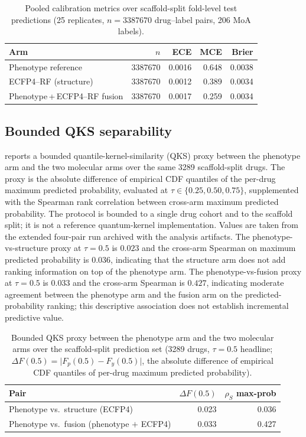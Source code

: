 \documentclass[11pt,a4paper]{article}
\begin{document}
\begin{table}[htbp]
\centering
\caption{Pooled calibration metrics over scaffold-split fold-level test predictions (\num{25} replicates, $n=\num{3387670}$ drug--label pairs, \num{206} MoA labels).}
\label{tab:p6_calibration}
\begin{tabular}{lrrrr}
\toprule
Arm & $n$ & ECE & MCE & Brier \\
\midrule
Phenotype reference & \num{3387670} & \num{0.0016} & \num{0.648} & \num{0.0038} \\
ECFP4--RF (structure) & \num{3387670} & \num{0.0012} & \num{0.389} & \num{0.0034} \\
Phenotype\,+\,ECFP4--RF fusion & \num{3387670} & \num{0.0017} & \num{0.259} & \num{0.0034} \\
\bottomrule
\end{tabular}
\end{table}

\subsection{Bounded QKS separability}

 reports a bounded quantile-kernel-similarity (QKS) proxy between the phenotype arm and the two molecular arms over the same \num{3289} scaffold-split drugs. The proxy is the absolute difference of empirical CDF quantiles of the per-drug maximum predicted probability, evaluated at $\tau\in\{0.25,0.50,0.75\}$, supplemented with the Spearman rank correlation between cross-arm maximum predicted probability. The protocol is bounded to a single drug cohort and to the scaffold split; it is not a reference quantum-kernel implementation. Values are taken from the extended four-pair run archived with the analysis artifacts. The phenotype-vs-structure proxy at $\tau=0.5$ is $\num{0.023}$ and the cross-arm Spearman on maximum predicted probability is $\num{0.036}$, indicating that the structure arm does not add ranking information on top of the phenotype arm. The phenotype-vs-fusion proxy at $\tau=0.5$ is $\num{0.033}$ and the cross-arm Spearman is $\num{0.427}$, indicating moderate agreement between the phenotype arm and the fusion arm on the predicted-probability ranking; this descriptive association does not establish incremental predictive value.

\begin{table}[htbp]
\centering
\caption{Bounded QKS proxy between the phenotype arm and the two molecular arms over the scaffold-split prediction set (\num{3289} drugs, $\tau=0.5$ headline; $\Delta F(0.5)=\lvert F_p(0.5)-F_y(0.5)\rvert$, the absolute difference of empirical CDF quantiles of per-drug maximum predicted probability).}
\label{tab:p6_qks}
\begin{tabular}{lrr}
\toprule
Pair & $\Delta F(0.5)$ & $\rho_S$ max-prob \\
\midrule
Phenotype vs.\ structure (ECFP4)   & \num{0.023} & \num{0.036} \\
Phenotype vs.\ fusion (phenotype $+$ ECFP4) & \num{0.033} & \num{0.427} \\
\bottomrule
\end{tabular}
\end{table}
\end{document}
